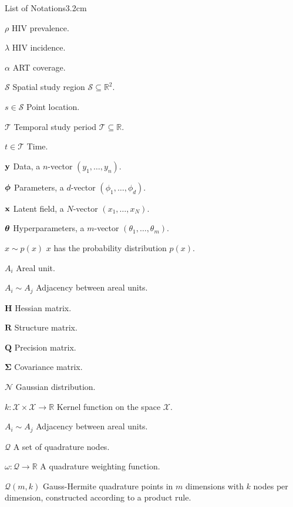 \begin{mclistof}{List of Notations}{3.2cm}

\item[$\rho$] HIV prevalence.
\item[$\lambda$] HIV incidence.
\item[$\alpha$] ART coverage.
\item[$\mathcal{S}$] Spatial study region $\mathcal{S} \subseteq \mathbb{R}^2$.
\item[$s \in \mathcal{S}$] Point location.
\item[$\mathcal{T}$] Temporal study period $\mathcal{T} \subseteq \mathbb{R}$.
\item[$t \in \mathcal{T}$] Time.
\item[$\boldsymbol{\mathbf{y}}$] Data, a $n$-vector $(y_1, \ldots, y_n)$.
\item[$\boldsymbol{\mathbf{\phi}}$] Parameters, a $d$-vector $(\phi_1, \ldots, \phi_d)$.
\item[$\mathbf{x}$] Latent field, a $N$-vector $(x_1, \ldots, x_N)$.
\item[$\bm{\theta}$] Hyperparameters, a $m$-vector $(\theta_1, \ldots, \theta_m)$.
\item[$x \sim p(x)$] $x$ has the probability distribution $p(x)$.
\item[$A_i$] Areal unit.
\item[$A_i \sim A_j$] Adjacency between areal units.
\item[$\mathbf{H}$] Hessian matrix.
\item[$\mathbf{R}$] Structure matrix.
\item[$\mathbf{Q}$] Precision matrix.
\item[$\bm{\Sigma}$] Covariance matrix.
\item[$\mathcal{N}$] Gaussian distribution.
\item[$k: \mathcal{X} \times \mathcal{X} \to \mathbb{R}$] Kernel function on the space $\mathcal{X}$.
\item[$A_i \sim A_j$] Adjacency between areal units.
\item[$\mathcal{Q}$] A set of quadrature nodes.
\item[$\omega: \mathcal{Q} \to \mathbb{R}$] A quadrature weighting function.
\item[$\mathcal{Q}(m, k)$] Gauss-Hermite quadrature points in $m$ dimensions with $k$ nodes per dimension, constructed according to a product rule.

\end{mclistof} 